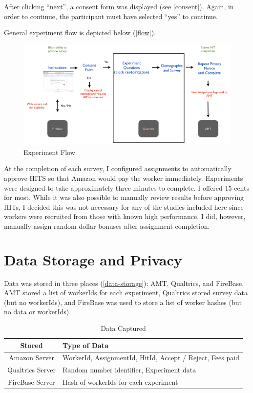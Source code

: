 After clicking ``next'', a consent form was displayed (see  \autoref{consent}).  Again, in order to continue, the participant must have selected ``yes'' to continue.

General experiment flow is depicted below  (\autoref{flow}). 


\begin{figure}
\centerline{
  \includegraphics[scale=.25]{chapter4.tex/expflow}
  }
\caption{Experiment Flow}
\label{flow}
\end{figure}


At the completion of each survey, I configured assignments to automatically approve HITS so that Amazon would pay the worker immediately. Experiments were designed to take approximately three minutes to complete. I offered 15 cents for most. While it was also possible to manually review results before approving HITs, I decided this was not necessary for any of the studies included here since workers were recruited from those with known high performance. I did, however, manually assign random dollar bonuses after assignment completion.

\section{Data Storage and Privacy}
\label{datastorageandprivacy}

Data was stored in three places  (\autoref{data-storage}): AMT, Qualtrics, and FireBase.  AMT stored a list of workerIds for each experiment, Qualtrics stored survey data (but no workerIds), and FireBase was used to store a list of worker hashes (but no data or workerIds).

\begin{table}
\caption[Data Captured]{Data Captured}
\label{data-storage}
\centering
\begin{tabular}{cp{7cm}}
\toprule
Stored & Type of Data\tabularnewline
\hline 
Amazon Server \medskip{} & WorkerId, AssignmentId, HitId, Accept / Reject, Fees paid\tabularnewline
Qualtrics Server \medskip{}  
 & Random number identifier, Experiment data\tabularnewline
FireBase Server\medskip{}
 & Hash of workerIds for each experiment\tabularnewline
\end{tabular}
\end{table}

